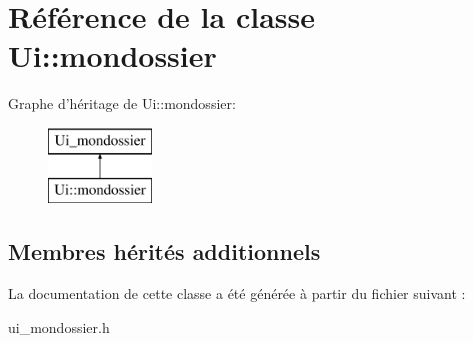 \hypertarget{class_ui_1_1mondossier}{\section{Référence de la classe Ui\+:\+:mondossier}
\label{class_ui_1_1mondossier}
}
Graphe d'héritage de Ui\+:\+:mondossier\+:\begin{figure}[H]
\begin{center}
\leavevmode
\includegraphics[height=2.000000cm]{class_ui_1_1mondossier}
\end{center}
\end{figure}
\subsection*{Membres hérités additionnels}


La documentation de cette classe a été générée à partir du fichier suivant \+:\begin{DoxyCompactItemize}
\item 
ui\+\_\+mondossier.\+h\end{DoxyCompactItemize}
